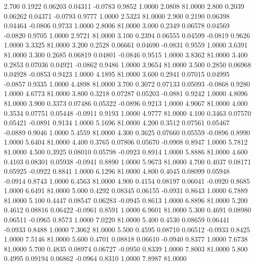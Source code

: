    2.700   0.1922   0.06203   0.04311  -0.0783   0.9852   1.0000   2.0808  81.0000
   2.800   0.2039   0.06262   0.04371  -0.0793   0.9777   1.0000   2.5323  81.0000
   2.900   0.2190   0.06398   0.04464  -0.0806   0.9733   1.0000   2.8006  81.0000
   3.000   0.2349   0.06578   0.04569  -0.0820   0.9705   1.0000   2.9721  81.0000
   3.100   0.2394   0.06555   0.04599  -0.0819   0.9626   1.0000   3.3325  81.0000
   3.200   0.2528   0.06661   0.04690  -0.0831   0.9559   1.0000   3.6391  81.0000
   3.300   0.2685   0.06819   0.04801  -0.0846   0.9515   1.0000   3.8362  81.0000
   3.400   0.2853   0.07036   0.04921  -0.0862   0.9486   1.0000   3.9654  81.0000
   3.500   0.2850   0.06968   0.04928  -0.0853   0.9423   1.0000   4.1895  81.0000
   3.600   0.2941   0.07015   0.04995  -0.0857   0.9335   1.0000   4.4898  81.0000
   3.700   0.3072   0.07133   0.05093  -0.0868   0.9280   1.0000   4.6773  81.0000
   3.800   0.3218   0.07287   0.05203  -0.0881   0.9242   1.0000   4.8096  81.0000
   3.900   0.3373   0.07486   0.05322  -0.0896   0.9213   1.0000   4.9067  81.0000
   4.000   0.3534   0.07751   0.05448  -0.0911   0.9193   1.0000   4.9777  81.0000
   4.100   0.3463   0.07570   0.05421  -0.0891   0.9134   1.0000   5.1696  81.0000
   4.200   0.3512   0.07561   0.05467  -0.0889   0.9046   1.0000   5.4559  81.0000
   4.300   0.3625   0.07660   0.05559  -0.0896   0.8990   1.0000   5.6404  81.0000
   4.400   0.3765   0.07806   0.05670  -0.0908   0.8947   1.0000   5.7812  81.0000
   4.500   0.3925   0.08010   0.05798  -0.0923   0.8914   1.0000   5.8886  81.0000
   4.600   0.4103   0.08301   0.05938  -0.0941   0.8890   1.0000   5.9673  81.0000
   4.700   0.4037   0.08171   0.05925  -0.0922   0.8841   1.0000   6.1296  81.0000
   4.800   0.4045   0.08099   0.05948  -0.0914   0.8743   1.0000   6.4563  81.0000
   4.900   0.4154   0.08197   0.06041  -0.0920   0.8685   1.0000   6.6491  81.0000
   5.000   0.4292   0.08345   0.06155  -0.0931   0.8643   1.0000   6.7889  81.0000
   5.100   0.4447   0.08547   0.06283  -0.0945   0.8613   1.0000   6.8896  81.0000
   5.200   0.4612   0.08816   0.06422  -0.0961   0.8591   1.0000   6.9601  81.0000
   5.300   0.4691   0.08980   0.06511  -0.0965   0.8573   1.0000   7.0220  81.0000
   5.400   0.4530   0.08659   0.06441  -0.0933   0.8488   1.0000   7.3062  81.0000
   5.500   0.4595   0.08710   0.06512  -0.0933   0.8425   1.0000   7.5146  81.0000
   5.600   0.4701   0.08818   0.06610  -0.0940   0.8377   1.0000   7.6738  81.0000
   5.700   0.4835   0.08974   0.06727  -0.0950   0.8339   1.0000   7.8003  81.0000
   5.800   0.4995   0.09194   0.06862  -0.0964   0.8310   1.0000   7.8987  81.0000
